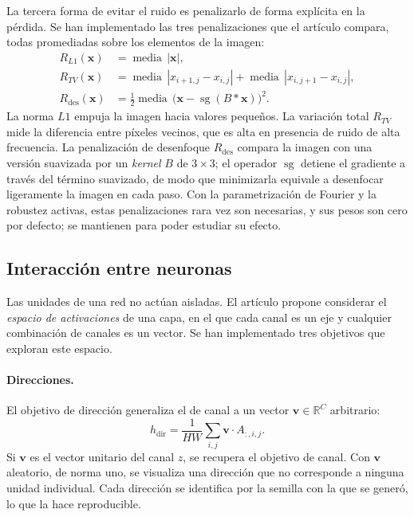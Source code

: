 \documentclass[11pt,a4paper]{article}
\newcommand{\vx}{\mathbf{x}}
\begin{document}
La tercera forma de evitar el ruido es penalizarlo de forma explícita en la
pérdida. Se han implementado las tres penalizaciones que el artículo
compara, todas promediadas sobre los elementos de la imagen:
\begin{align}
R_{L1}(\vx) &= \operatorname{media}\, |\vx|, \\
R_{TV}(\vx) &= \operatorname{media}\, |x_{i+1,j} - x_{i,j}| + \operatorname{media}\, |x_{i,j+1} - x_{i,j}|,
\label{eq:tv}\\
R_{\text{des}}(\vx) &= \tfrac{1}{2}\operatorname{media}\,\bigl(\vx - \operatorname{sg}(B * \vx)\bigr)^{2}.
\end{align}
La norma $L1$ empuja la imagen hacia valores pequeños. La variación total
$R_{TV}$ mide la diferencia entre píxeles vecinos, que es alta en presencia
de ruido de alta frecuencia. La penalización de desenfoque $R_{\text{des}}$
compara la imagen con una versión suavizada por un \emph{kernel} $B$ de
$3 \times 3$; el operador $\operatorname{sg}$ detiene el gradiente a través
del término suavizado, de modo que minimizarla equivale a desenfocar
ligeramente la imagen en cada paso. Con la parametrización de Fourier y la
robustez activas, estas penalizaciones rara vez son necesarias, y sus
pesos son cero por defecto; se mantienen para poder estudiar su efecto.

\subsection{Interacción entre neuronas}
\label{sec:interaccion}

Las unidades de una red no actúan aisladas. El artículo propone considerar
el \emph{espacio de activaciones} de una capa, en el que cada canal es un
eje y cualquier combinación de canales es un vector. Se han implementado
tres objetivos que exploran este espacio.

\paragraph{Direcciones.} El objetivo de dirección generaliza el de canal a
un vector $\mathbf{v} \in \mathbb{R}^{C}$ arbitrario:
\begin{equation}
h_{\text{dir}} = \frac{1}{HW}\sum_{i,j} \mathbf{v} \cdot A_{:,i,j}.
\end{equation}
Si $\mathbf{v}$ es el vector unitario del canal $z$, se recupera el objetivo
de canal. Con $\mathbf{v}$ aleatorio, de norma uno, se visualiza una
dirección que no corresponde a ninguna unidad individual. Cada dirección se
identifica por la semilla con la que se generó, lo que la hace
reproducible.
\end{document}
